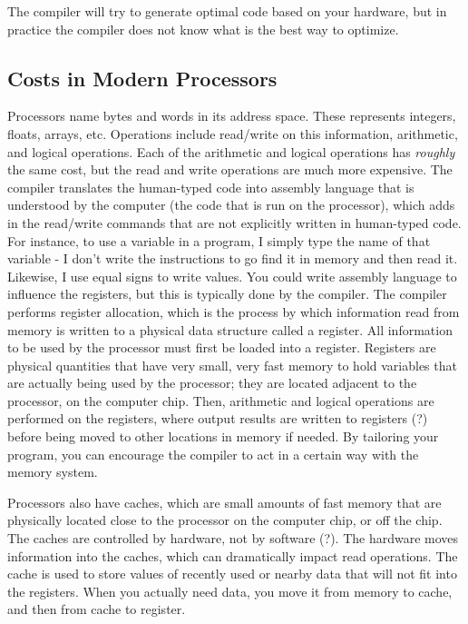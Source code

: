 \documentclass[10pt]{article}
\begin{document}
\begin{flushleft}
The compiler will try to generate optimal code based on your hardware, but in practice the compiler does not know what is the best way to optimize. 

\subsection{Costs in Modern Processors}

Processors name bytes and words in its address space. These represents integers, floats, arrays, etc. Operations include read/write on this information, arithmetic, and logical operations. Each of the arithmetic and logical operations has \textit{roughly} the same cost, but the read and write operations are much more expensive. The compiler translates the human-typed code into assembly language that is understood by the computer (the code that is run on the processor), which adds in the read/write commands that are not explicitly written in human-typed code. For instance, to use a variable in a program, I simply type the name of that variable - I don't write the instructions to go find it in memory and then read it. Likewise, I use equal signs to write values. You could write assembly language to influence the registers, but this is typically done by the compiler. The compiler performs register allocation, which is the process by which information read from memory is written to a physical data structure called a register. All information to be used by the processor must first be loaded into a register. Registers are physical quantities that have very small, very fast memory to hold variables that are actually being used by the processor; they are located adjacent to the processor, on the computer chip. Then, arithmetic and logical operations are performed on the registers, where output results are written to registers (?) before being moved to other locations in memory if needed. By tailoring your program, you can encourage the compiler to act in a certain way with the memory system.

Processors also have caches, which are small amounts of fast memory that are physically located close to the processor on the computer chip, or off the chip. The caches are controlled by hardware, not by software (?). The hardware moves information into the caches, which can dramatically impact read operations. The cache is used to store values of recently used or nearby data that will not fit into the registers. When you actually need data, you move it from memory to cache, and then from cache to register. 


\end{flushleft}
\end{document}

